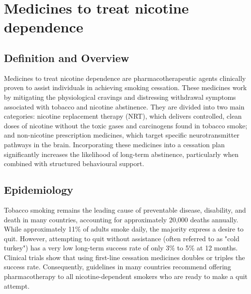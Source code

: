 \chapter{Medicines to treat nicotine dependence}

\section*{Definition and Overview}
Medicines to treat nicotine dependence are pharmacotherapeutic agents clinically proven to assist individuals in achieving smoking cessation. These medicines work by mitigating the physiological cravings and distressing withdrawal symptoms associated with tobacco and nicotine abstinence. They are divided into two main categories: nicotine replacement therapy (NRT), which delivers controlled, clean doses of nicotine without the toxic gases and carcinogens found in tobacco smoke; and non-nicotine prescription medicines, which target specific neurotransmitter pathways in the brain. Incorporating these medicines into a cessation plan significantly increases the likelihood of long-term abstinence, particularly when combined with structured behavioural support.

\section*{Epidemiology}
Tobacco smoking remains the leading cause of preventable disease, disability, and death in many countries, accounting for approximately 20,000 deaths annually. While approximately 11\% of adults smoke daily, the majority express a desire to quit. However, attempting to quit without assistance (often referred to as "cold turkey") has a very low long-term success rate of only 3\% to 5\% at 12 months. Clinical trials show that using first-line cessation medicines doubles or triples the success rate. Consequently, guidelines in many countries recommend offering pharmacotherapy to all nicotine-dependent smokers who are ready to make a quit attempt.

